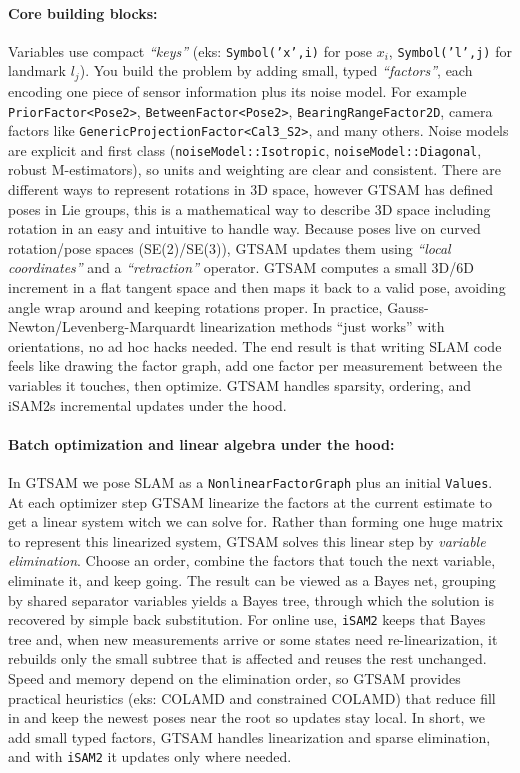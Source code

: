 \paragraph{Core building blocks:}
Variables use compact \textit{``keys''} (eks: \texttt{Symbol('x',i)} for pose $x_i$, \texttt{Symbol('l',j)} for landmark $l_j$). You build the problem by adding small, typed \textit{``factors''}, each encoding one piece of sensor information plus its noise model. For example \texttt{PriorFactor<Pose2>}, \texttt{BetweenFactor<Pose2>}, \texttt{BearingRangeFactor2D}, camera factors like \texttt{GenericProjectionFactor<Cal3\_S2>}, and many others. Noise models are explicit and first class (\texttt{noiseModel::Isotropic}, \texttt{noiseModel::Diagonal}, robust M-estimators), so units and weighting are clear and consistent. There are different ways to represent rotations in 3D space, however \gls{GTSAM} has defined poses in Lie groups, this is a mathematical way to describe 3D space including rotation in an easy and intuitive to handle way. Because poses live on curved rotation/pose spaces (SE(2)/SE(3)), \gls{GTSAM} updates them using \textit{``local coordinates''} and a \textit{``retraction''} operator. \gls{GTSAM} computes a small 3D/6D increment in a flat tangent space and then maps it back to a valid pose, avoiding angle wrap around and keeping rotations proper. In practice, Gauss-Newton/Levenberg-Marquardt linearization methods ``just works'' with orientations, no ad hoc hacks needed. The end result is that writing \gls{SLAM} code feels like drawing the factor graph, add one factor per measurement between the variables it touches, then optimize. \gls{GTSAM} handles sparsity, ordering, and iSAM2s incremental updates under the hood. \cite{GTSAM_handbook}

\paragraph{Batch optimization and linear algebra under the hood:}
In \gls{GTSAM} we pose \gls{SLAM} as a \texttt{NonlinearFactorGraph} plus an initial \texttt{Values}. At each optimizer step \gls{GTSAM} linearize the factors at the current estimate to get a linear system witch we can solve for. Rather than forming one huge matrix to represent this linearized system, \gls{GTSAM} solves this linear step by \emph{variable elimination}. Choose an order, combine the factors that touch the next variable, eliminate it, and keep going. The result can be viewed as a Bayes net, grouping by shared separator variables yields a Bayes tree, through which the solution is recovered by simple back substitution. For online use, \texttt{iSAM2} keeps that Bayes tree and, when new measurements arrive or some states need re-linearization, it rebuilds only the small subtree that is affected and reuses the rest unchanged. Speed and memory depend on the elimination order, so \gls{GTSAM} provides practical heuristics (eks: COLAMD and constrained COLAMD) that reduce fill in and keep the newest poses near the root so updates stay local. In short, we add small typed factors, \gls{GTSAM} handles linearization and sparse elimination, and with \texttt{iSAM2} it updates only where needed. \cite{GTSAM_handbook}

